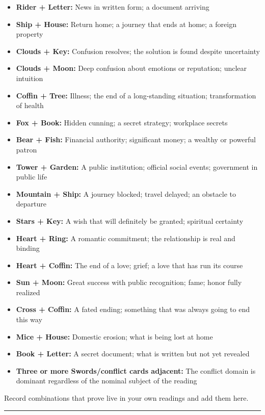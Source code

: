 \begin{itemize}
\tightlist
\item
  \textbf{Rider + Letter:} News in written form; a document arriving
\item
  \textbf{Ship + House:} Return home; a journey that ends at home; a foreign property
\item
  \textbf{Clouds + Key:} Confusion resolves; the solution is found despite uncertainty
\item
  \textbf{Clouds + Moon:} Deep confusion about emotions or reputation; unclear intuition
\item
  \textbf{Coffin + Tree:} Illness; the end of a long-standing situation; transformation of health
\item
  \textbf{Fox + Book:} Hidden cunning; a secret strategy; workplace secrets
\item
  \textbf{Bear + Fish:} Financial authority; significant money; a wealthy or powerful patron
\item
  \textbf{Tower + Garden:} A public institution; official social events; government in public life
\item
  \textbf{Mountain + Ship:} A journey blocked; travel delayed; an obstacle to departure
\item
  \textbf{Stars + Key:} A wish that will definitely be granted; spiritual certainty
\item
  \textbf{Heart + Ring:} A romantic commitment; the relationship is real and binding
\item
  \textbf{Heart + Coffin:} The end of a love; grief; a love that has run its course
\item
  \textbf{Sun + Moon:} Great success with public recognition; fame; honor fully realized
\item
  \textbf{Cross + Coffin:} A fated ending; something that was always going to end this way
\item
  \textbf{Mice + House:} Domestic erosion; what is being lost at home
\item
  \textbf{Book + Letter:} A secret document; what is written but not yet revealed
\item
  \textbf{Three or more Swords/conflict cards adjacent:} The conflict domain is dominant regardless of the nominal subject of the reading
\end{itemize}

Record combinations that prove live in your own readings and add them here.

\begin{center}\rule{0.5\linewidth}{0.5pt}\end{center}

